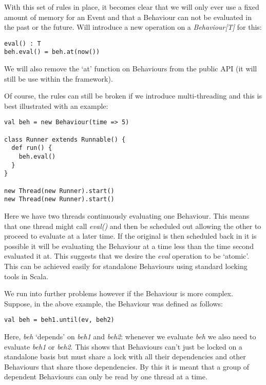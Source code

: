       With this set of rules in place, it becomes clear that we will only ever use a fixed amount of memory
      for an Event and that a Behaviour can not be evaluated in the past or the future. Will
      introduce a new operation on a \emph{Behaviour[T]} for this:

\begin{verbatim}
eval() : T
beh.eval() = beh.at(now())
\end{verbatim}       

      We will also remove the `at' function on Behaviours from the public API (it will still be
      use within the framework). 
      
      Of course, the rules can still be broken if we introduce multi-threading and this is best illustrated
      with an example:
      
\begin{verbatim}
val beh = new Behaviour(time => 5)

class Runner extends Runnable() {
  def run() {
    beh.eval()
  }
}

new Thread(new Runner).start()
new Thread(new Runner).start()
\end{verbatim}       

      Here we have two threads continuously evaluating one Behaviour. This means that one thread
      might call \emph{eval()} and then be scheduled out allowing the other to proceed to evaluate
      at a later time. If the original is then scheduled back in it is possible it will
      be evaluating the Behaviour at a time less than the time second evaluated it at. This suggests
      that we desire the \emph{eval} operation to be `atomic'. This can be achieved easily for standalone
      Behaviours using standard locking tools in Scala.
      
      We run into further problems however if the Behaviour is more complex. Suppose, in the above example,
      the Behaviour was defined as follows:

\begin{verbatim}
val beh = beh1.until(ev, beh2)
\end{verbatim}        

      Here, \emph{beh} `depends' on \emph{beh1} and \emph{beh2}: whenever we evaluate \emph{beh}
      we also need to evaluate \emph{beh1} or \emph{beh2}. This shows that Behaviours can't just
      be locked on a standalone basis but must share a lock with all their dependencies and other Behaviours
      that share those dependencies. By this it is meant that a group of dependent Behaviours can
      only be read by one thread at a time.
      
